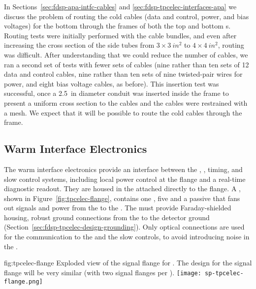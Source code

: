 In Sections~\ref{sec:fdsp-apa-intfc-cables} and \ref{sec:fdsp-tpcelec-interfaces-apa}
we discuss the problem of routing the cold cables (data and control, power, and 
bias voltages) for the bottom  through the frames of both
the top and bottom s. Routing tests were initially performed
with the  cable bundles, and even after increasing 
the cross section of the side tubes from $\num{3}\times\SI{3}{in^2}$ 
to $\num{4}\times\SI{4}{in^2}$, routing was difficult. After understanding that we
could reduce the number of cables, we ran a second set of tests with fewer sets 
of cables (nine rather than ten sets of 12 data and control cables, nine rather than 
ten sets of nine twisted-pair wires for power, and eight bias voltage cables, as before).
This insertion test was successful, once
a \SI{2.5}{in} diameter conduit was inserted inside the 
 frame to present a uniform cross section to
the cables and the cables were restrained with a mesh. We expect that it will be possible
to route the cold cables through the  frame.

\subsection{Warm Interface Electronics}
\label{sec:fdsp-tpcelec-design-warm}

The warm interface electronics provide an interface between the 
, , timing, and slow control systems, including 
local power control at the flange and a real-time diagnostic readout. 
They are housed in the  attached directly to the  
flange.  %
A , shown in Figure~\ref{fig:tpcelec-flange}, 
contains one , %
 five %
 and a passive 
that fans out signals and  power from the  to the 
. The  must provide Faraday-shielded housing, 
robust ground connections from the  to the detector ground 
(Section~\ref{sec:fdsp-tpcelec-design-grounding}). Only optical
connections are used for the communication to the  and the
slow controls, to avoid introducing noise in the  \fdth.

\begin{dunefigure}
{fig:tpcelec-flange}
{Exploded view of the  signal flange for .  
The design for the   
signal flange will be very similar (with two  signal flanges per \fdth).}
\texttt{[image: sp-tpcelec-flange.png]}
\end{dunefigure}

